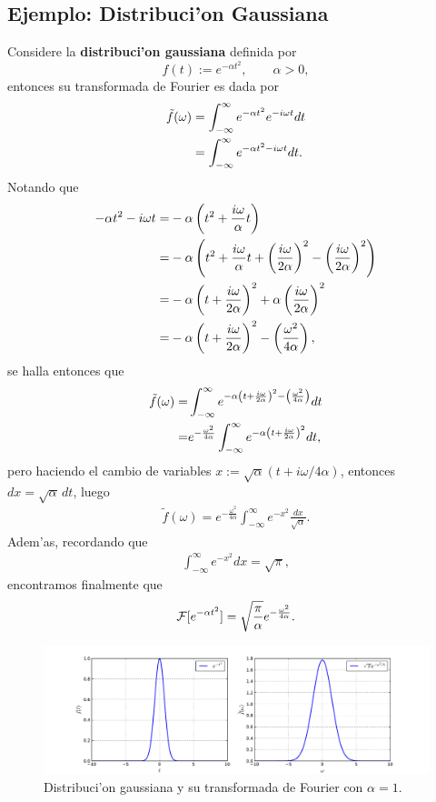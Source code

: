 \subsection{Ejemplo: Distribuci'on Gaussiana}
Considere la \textbf{distribuci'on gaussiana} definida por
\begin{equation}\label{fgauss}
f(t):= e^{-\alpha t^2}, \qquad \alpha>0,
\end{equation}
entonces su transformada de Fourier es dada por
\begin{align}
\tilde{f}(\omega) &= \int_{-\infty}^{\infty}e^{-\alpha t^2} e^{-i \omega t}dt\notag \\
&= \int_{-\infty}^{\infty}e^{-\alpha t^2-i\omega t} dt.
\end{align}
Notando que
\begin{align}
-\alpha t^2-i\omega t=&-\alpha \left(t^2+\frac{i\omega}{\alpha}t\right) \notag \\
=&-\alpha\left(t^2+\frac{i\omega}{\alpha}t+\left(\frac{i\omega}{2\alpha}\right)^2-\left(\frac{i\omega}{2\alpha}\right)^2\right) \notag \\
=&-\alpha \left( t+\frac{i\omega}{2\alpha} \right)^2+\alpha\left(\frac{i\omega}{2\alpha}\right)^2\notag \\
=&-\alpha \left( t+\frac{i\omega}{2\alpha} \right)^2-\left(\frac{\omega^2}{4\alpha}\right),
\end{align}
se halla entonces que
\begin{align}
\tilde{f}(\omega)=&\int_{-\infty}^{\infty}e^{-\alpha \left( t+\frac{i\omega}{2\alpha} \right)^2-\left(\frac{\omega^2}{4\alpha}\right)}dt\notag\\
=& e^{-\frac{\omega^2}{4\alpha}}\int_{-\infty}^{\infty}e^{-\alpha \left( t+\frac{i\omega}{2\alpha} \right)^2}dt,
\end{align}
pero haciendo el cambio de variables $x:=\sqrt{\alpha}(t+i\omega/4\alpha)$, entonces $dx=\sqrt{\alpha}\,dt$, luego
\begin{align}
\tilde{f}(\omega)=e^{-\frac{\omega^2}{4\alpha}}\int_{-\infty}^{\infty}e^{-x^2} \frac{dx}{\sqrt{\alpha}}.
\end{align}
Adem'as, recordando que
\begin{align}
\int_{-\infty}^{\infty}e^{-x^2}dx=\sqrt{\pi},
\end{align}
encontramos finalmente que
\begin{equation}\label{Tfgauss}
{\cal F}[e^{-\alpha t^2}]=\sqrt{\frac{\pi}{\alpha}}e^{-\frac{\omega^2}{4\alpha}}.
\end{equation}
\begin{figure}[h]
\centering
\includegraphics[scale=0.4]{figs/fig-Fourier-Gaussiana.pdf}
\caption{Distribuci'on gaussiana y su transformada de Fourier con $\alpha=1$.}
\label{im:gaussiana}
\end{figure}

